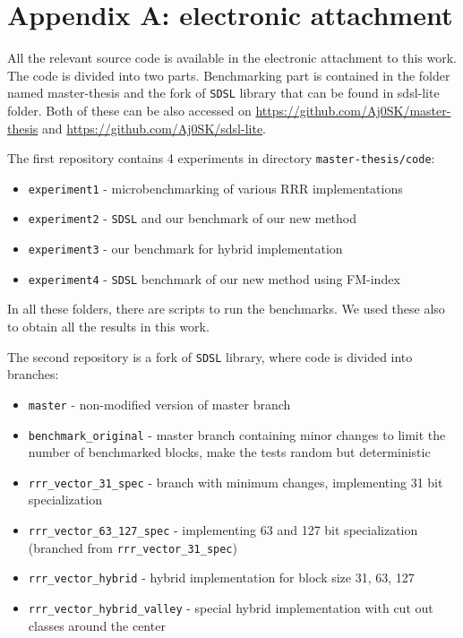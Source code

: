 \chapter*{Appendix A: electronic attachment}

All the relevant source code is available in the electronic attachment to this work.
The code is divided into two parts. Benchmarking part is contained in the folder named
master-thesis and the fork of \texttt{SDSL} library that can be found in sdsl-lite folder.
Both of these can be also accessed on \url{https://github.com/Aj0SK/master-thesis} and
\url{https://github.com/Aj0SK/sdsl-lite}.

The first repository contains 4 experiments in directory \texttt{master-thesis/code}:
\begin{itemize}
    \item \texttt{experiment1} - microbenchmarking of various RRR implementations
    \item \texttt{experiment2} - \texttt{SDSL} and our benchmark of our new method
    \item \texttt{experiment3} - our benchmark for hybrid implementation
    \item \texttt{experiment4} - \texttt{SDSL} benchmark of our new method using FM-index
\end{itemize}
In all these folders, there are scripts to run the benchmarks. We used these also to obtain
all the results in this work. 

The second repository is a fork of \texttt{SDSL} library, where code is divided into
branches:
\begin{itemize}
    \item \texttt{master} - non-modified version of master branch
    \item \texttt{benchmark\_original} - master branch containing minor changes
        to limit the number of benchmarked blocks, make the tests random but deterministic
    \item \texttt{rrr\_vector\_31\_spec} - branch with minimum changes, implementing 31 bit specialization
    \item \texttt{rrr\_vector\_63\_127\_spec} - implementing 63 and 127 bit specialization (branched from \texttt{rrr\_vector\_31\_spec})
    \item \texttt{rrr\_vector\_hybrid} - hybrid implementation for block size 31, 63, 127
    \item \texttt{rrr\_vector\_hybrid\_valley} - special hybrid implementation with cut out classes around the center
\end{itemize}